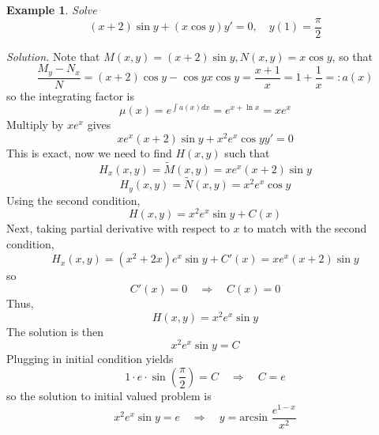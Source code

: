 \documentclass[10pt]{amsart}
\newtheorem{example}{Example}
\renewcommand{\ni}{\noindent}
\newcommand{\ti}{\textit}
\newcommand{\imply}{ \quad \Rightarrow \quad}
\newcommand{\bex}{\begin{example}}
\newcommand{\eex}{\end{example}}
\newcommand{\tdM}{\tilde{M}}
\newcommand{\tdN}{\tilde{N}}
\newcommand{\Sol}{\ni\ti{Solution. }}
\begin{document}
\vspace{0.2in}
\bex Solve 
$$(x+2)\sin y +( x \cos y) y' = 0,\quad  y(1) = \frac{\pi}{2} $$
\eex
\Sol Note that $M(x,y) = (x+2)\sin y, N(x,y) =x \cos y$, so that
$$ \frac{M_{y}-N_{x}}{N} = {(x+2)\cos y - \cos y}{x\cos y } = \frac{x+1}{x} = 1+\frac{1}{x} =: a(x) $$
so the integrating factor is
$$ \mu(x) = e^{\int a(x)dx} = e^{x + \ln x} = xe^{x} $$
Multiply by $xe^{x}$ gives
$$ xe^{x}(x+2)\sin y+ x^{2}e^{x}\cos y y' = 0 $$
This is exact, now we need to find $H(x,y)$ such that
$$ H_{x}(x,y) = \tdM(x,y) = xe^{x}(x+2)\sin y $$
$$ H_{y}(x,y) = \tdN(x,y) = x^{2}e^{x}\cos y $$
Using the second condition, 
$$ H(x,y) =  x^{2}e^{x}\sin y + C(x) $$
Next, taking partial derivative with respect to $x$ to match with the second condition,
$$ H_{x}(x,y) = (x^{2}+2x)e^{x}\sin y  + C'(x)  =  xe^{x}(x+2)\sin y $$
so
$$ C'(x) =0 \imply C(x) = 0 $$
Thus, 
$$H(x,y) = x^{2}e^{x}\sin y  $$
The solution is then
$$   x^{2}e^{x}\sin y = C $$
Plugging in initial condition yields
$$ 1\cdot e \cdot \sin(\frac{\pi}{2}) = C \imply C = e $$
so the solution to initial valued problem is
$$ x^{2}e^{x}\sin y = e \imply y = \text{arcsin }\frac{e^{1-x}}{x^{2}} $$







 
\end{document}
